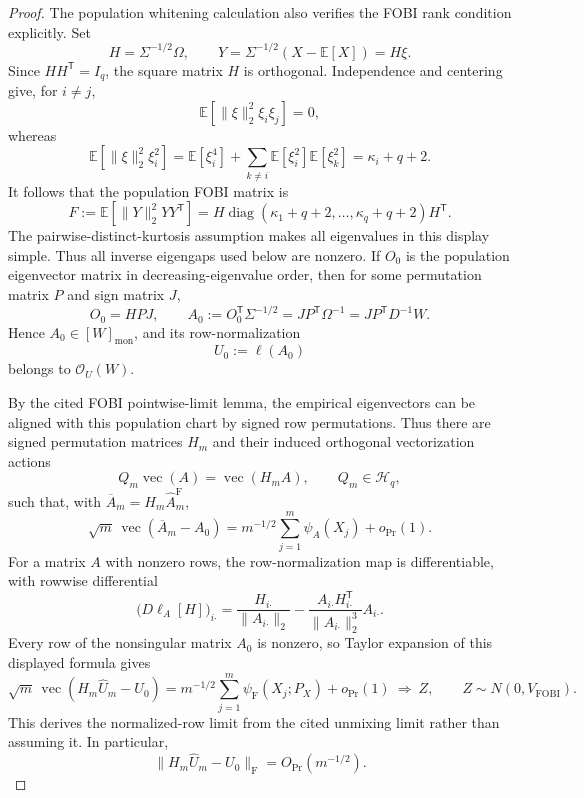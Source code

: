 \documentclass{article}
\begin{document}
\begin{proof}
The population whitening calculation also verifies the FOBI rank condition explicitly. Set
\[
 H=\Sigma^{-1/2}\Omega,
 \qquad
 Y=\Sigma^{-1/2}(X-\mathbb E[X])=H\xi.
\]
Since \(HH^{\mathsf T}=I_q\), the square matrix \(H\) is orthogonal. Independence and centering give, for \(i\neq j\),
\[
 \mathbb E\!\left[\|\xi\|_2^2\xi_i\xi_j\right]=0,
\]
whereas
\[
 \mathbb E\!\left[\|\xi\|_2^2\xi_i^2\right]
 =\mathbb E[\xi_i^4]+
   \sum_{k\neq i}\mathbb E[\xi_i^2]\mathbb E[\xi_k^2]
 =\kappa_i+q+2.
\]
It follows that the population FOBI matrix is
\[
 F:=\mathbb E[\|Y\|_2^2YY^{\mathsf T}]
 =H\operatorname{diag}(\kappa_1+q+2,\ldots,\kappa_q+q+2)H^{\mathsf T}.
\]
The pairwise-distinct-kurtosis assumption makes all eigenvalues in this display simple. Thus all inverse eigengaps used below are nonzero. If \(O_0\) is the population eigenvector matrix in decreasing-eigenvalue order, then for some permutation matrix \(P\) and sign matrix \(J\),
\[
 O_0=HPJ,
 \qquad
 A_0:=O_0^{\mathsf T}\Sigma^{-1/2}
 =JP^{\mathsf T}\Omega^{-1}
 =JP^{\mathsf T}D^{-1}W.
\]
Hence \(A_0\in[W]_{\mathrm{mon}}\), and its row-normalization
\[
 U_0:=\ell(A_0)
\]
belongs to \(\mathcal O_U(W)\).

By the cited FOBI pointwise-limit lemma, the empirical eigenvectors can be aligned with this population chart by signed row permutations. Thus there are signed permutation matrices \(H_m\) and their induced orthogonal vectorization actions
\[
 Q_m\operatorname{vec}(A)=\operatorname{vec}(H_mA),
 \qquad Q_m\in\mathcal H_q,
\]
such that, with \(\overline A_m=H_m\widehat A_m^{\mathrm F}\),
\[
 \sqrt m\,\operatorname{vec}(\overline A_m-A_0)
 =m^{-1/2}\sum_{j=1}^m\psi_A(X_j)+o_{\Pr}(1).
\]
For a matrix \(A\) with nonzero rows, the row-normalization map is differentiable, with rowwise differential
\[
 \bigl(D\ell_A[H]\bigr)_{i\boldsymbol\cdot}
 =\frac{H_{i\boldsymbol\cdot}}{\|A_{i\boldsymbol\cdot}\|_2}
 -\frac{A_{i\boldsymbol\cdot}H_{i\boldsymbol\cdot}^{\mathsf T}}
  {\|A_{i\boldsymbol\cdot}\|_2^3}A_{i\boldsymbol\cdot}.
\]
Every row of the nonsingular matrix \(A_0\) is nonzero, so Taylor expansion of this displayed formula gives
\[
 \sqrt m\,\operatorname{vec}(H_m\widehat U_m-U_0)
 =m^{-1/2}\sum_{j=1}^m\psi_{\mathrm F}(X_j;P_X)+o_{\Pr}(1)
 \ \Longrightarrow\ Z,
 \qquad
 Z\sim N(0,V_{\mathrm{FOBI}}).
\]
This derives the normalized-row limit from the cited unmixing limit rather than assuming it. In particular,
\[
 \|H_m\widehat U_m-U_0\|_{\mathrm F}=O_{\Pr}(m^{-1/2}).
\]


\end{proof}
\end{document}
